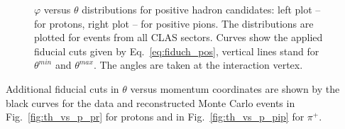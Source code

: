 \begin{figure}[!ht]
\begin{center}
\end{center}
\caption{\small $\varphi$ versus $\theta$ distributions for positive hadron candidates: left plot -- for protons, right plot -- for positive pions. The distributions are plotted for events from all CLAS sectors. Curves show the applied fiducial cuts given by Eq.~\eqref{eq:fiduch_pos}, vertical lines stand for $\theta^{min}$ and $\theta^{max}$. The angles are taken at the interaction vertex.}
\label{fig:fiduch_pos_2d}
\end{figure}

Additional fiducial cuts in $\theta$ versus momentum coordinates are shown by the black curves for the data and reconstructed Monte Carlo events in Fig.~\ref{fig:th_vs_p_pr} for protons and in Fig.~\ref{fig:th_vs_p_pip} for $\pi^{+}$.


\clearpage


